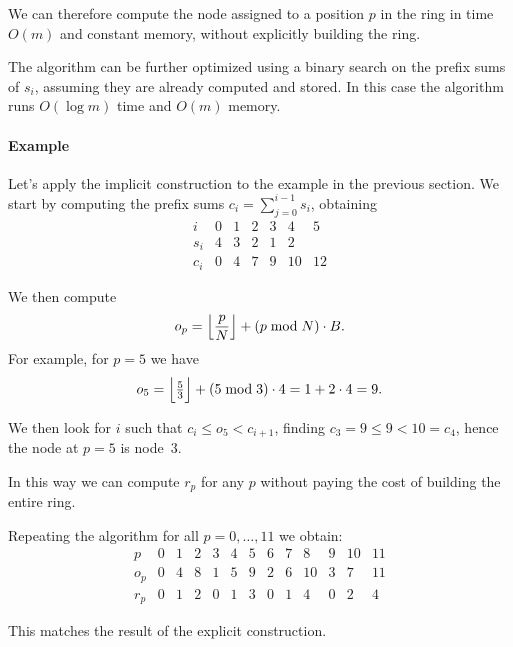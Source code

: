 We can therefore compute the node assigned to a position $p$ in the ring in
time $O(m)$ and constant memory, without explicitly building the ring.

The algorithm can be further optimized using a binary search on the prefix sums
of $s_i$, assuming they are already computed and stored.
In this case the algorithm runs $O(\log m)$ time and $O(m)$ memory.

\paragraph{Example}
Let's apply the implicit construction to the example in the previous section.
We start by computing the prefix sums $c_i = \sum_{j=0}^{i-1}
s_i$, obtaining
\[
    \begin{array}{c|cccccc}
        i   & 0 & 1 & 2 & 3 &  4 &  5 \\ \hline
        s_i & 4 & 3 & 2 & 1 &  2 &    \\ \hline
        c_i & 0 & 4 & 7 & 9 & 10 & 12
    \end{array}
\]

We then compute
\[
    o_p = \Bigl\lfloor \frac{p}{N} \Bigr\rfloor + (p \bmod N) \cdot B.
\]
For example, for $p = 5$ we have
\[
    o_5 = \Bigl\lfloor \tfrac{5}{3} \Bigr\rfloor + (5 \bmod 3) \cdot 4 =
    1 + 2\cdot4 = 9.
\]

We then look for $i$ such that $c_i \leq o_5 < c_{i+1}$, finding $c_3 = 9 \leq
9 < 10 = c_4$, hence the node at $p = 5$ is node~$3$.

In this way we can compute $r_p$ for any $p$ without paying the cost of
building the entire ring.

Repeating the algorithm for all $p = 0, \dots, 11$ we obtain:
\[
    \begin{array}{c|cccccccccccc}
        p   & 0 & 1 & 2 & 3 & 4 & 5 & 6 & 7 &  8 & 9 & 10 & 11 \\ \hline
        o_p & 0 & 4 & 8 & 1 & 5 & 9 & 2 & 6 & 10 & 3 &  7 & 11 \\ \hline
        r_p & 0 & 1 & 2 & 0 & 1 & 3 & 0 & 1 &  4 & 0 &  2 &  4
    \end{array}
\]

This matches the result of the explicit construction.
